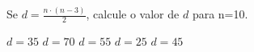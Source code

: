 Se $d=\frac{n\cdot(n-3)}{2}$, calcule o valor de $d$ para n=10.

$d=35$
$d=70$
$d=55$
$d=25$
$d=45$



